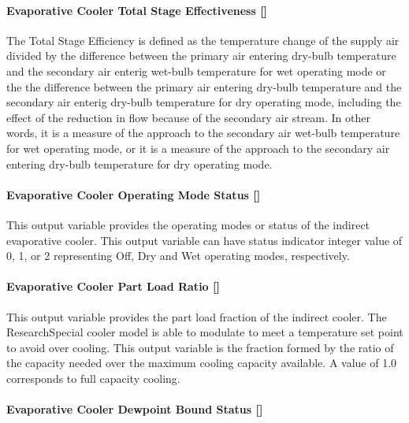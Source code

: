 \paragraph{Evaporative Cooler Total Stage Effectiveness {[]}}\label{evaporative-cooler-total-stage-effectiveness-2}

The Total Stage Efficiency is defined as the temperature change of the supply air divided by the difference between the primary air entering dry-bulb temperature and the secondary air enterig wet-bulb temperature for wet operating mode or the the difference between the primary air entering dry-bulb temperature and the secondary air enterig dry-bulb temperature for dry operating mode, including the effect of the reduction in flow because of the secondary air stream. In other words, it is a measure of the approach to the secondary air wet-bulb temperature for wet operating mode, or it is a measure of the approach to the secondary air entering dry-bulb temperature for dry operating mode.

\paragraph{Evaporative Cooler Operating Mode Status {[]}}\label{evaporative-cooler-operating-mode-status}

This output variable provides the operating modes or status of the indirect evaporative cooler. This output variable can have status indicator integer value of 0, 1, or 2 representing Off, Dry and Wet operating modes, respectively.

\paragraph{Evaporative Cooler Part Load Ratio {[]}}\label{evaporative-cooler-part-load-ratio}

This output variable provides the part load fraction of the indirect cooler. The ResearchSpecial cooler model is able to modulate to meet a temperature set point to avoid over cooling. This output variable is the fraction formed by the ratio of the capacity needed over the maximum cooling capacity available. A value of 1.0 corresponds to full capacity cooling.

\paragraph{Evaporative Cooler Dewpoint Bound Status {[]}}\label{evaporative-cooler-dewpoint-bound-status}

